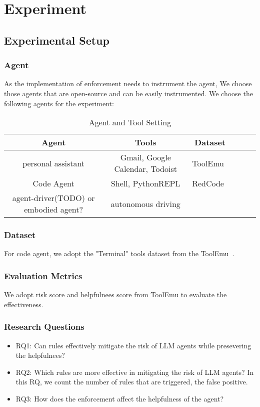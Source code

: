 \section{Experiment}    
\label{sec:experiment}

\subsection{Experimental Setup}

\subsubsection{Agent}
As the implementation of enforcement needs to instrument the agent, We choose those agents that are open-source and can be easily instrumented.
We choose the following agents for the experiment:

\begin{table}
    \centering
    \begin{tabular}{|c|c|c|c|c|c|}
    \hline
    \textbf{Agent}  &  \textbf{Tools} & \textbf{Dataset} \\
    \hline
    \hline
    personal assistant & Gmail, Google Calendar, Todoist & ToolEmu~\cite{} \\
    Code Agent & Shell, PythonREPL & RedCode~\cite{} \\
    agent-driver(TODO) or embodied agent? & autonomous driving & \\
    \hline
    \end{tabular}
    \caption{Agent and Tool Setting}
    \label{tab:agent_tool}
\end{table}

\subsubsection{Dataset}
For code agent, we adopt the "Terminal" tools dataset from the ToolEmu~\cite{}.

\subsubsection{Evaluation Metrics}

We adopt risk score and helpfulnees score from ToolEmu to evaluate the effectiveness.

\subsubsection{Research Questions}

\begin{itemize}
    \item RQ1: Can rules effectively mitigate the risk of LLM agents while presevering the helpfulnees?
    \item RQ2: Which rules are more effective in mitigating the risk of LLM agents? 
    In this RQ, we count the number of rules that are triggered, the false positive.
    \item RQ3: How does the enforcement affect the helpfulness of the agent? 
\end{itemize}


